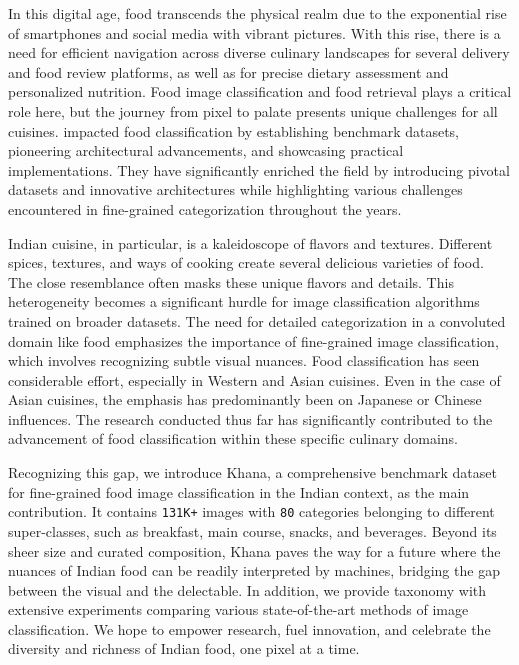 \documentclass{article}
\begin{document}
In this digital age, food transcends the physical realm due to the exponential rise of smartphones and social media with vibrant pictures. With this rise, there is a need for efficient navigation across diverse culinary landscapes for several delivery and food review platforms, as well as for precise dietary assessment and personalized nutrition. Food image classification and food retrieval plays a critical role here, but the journey from pixel to palate presents unique challenges for all cuisines. \cite{arxiv.1907.06167, Min2020, Min2023} impacted food classification by establishing benchmark datasets, pioneering architectural advancements, and showcasing practical implementations. They have significantly enriched the field by introducing pivotal datasets and innovative architectures while highlighting various challenges encountered in fine-grained categorization throughout the years.

Indian cuisine, in particular, is a kaleidoscope of flavors and textures. Different spices, textures, and ways of cooking create several delicious varieties of food. The close resemblance often masks these unique flavors and details. This heterogeneity becomes a significant hurdle for image classification algorithms trained on broader datasets. The need for detailed categorization in a convoluted domain like food emphasizes the importance of fine-grained image classification, which involves recognizing subtle visual nuances. Food classification has seen considerable effort, especially in Western and Asian cuisines. Even in the case of Asian cuisines, the emphasis has predominantly been on Japanese or Chinese influences. The research conducted thus far has significantly contributed to the advancement of food classification within these specific culinary domains.

Recognizing this gap, we introduce Khana, a comprehensive benchmark dataset for fine-grained food image classification in the Indian context, as the main contribution. It contains \texttt{131K+} images with \texttt{80} categories belonging to different super-classes, such as breakfast, main course, snacks, and beverages. Beyond its sheer size and curated composition, Khana paves the way for a future where the nuances of Indian food can be readily interpreted by machines, bridging the gap between the visual and the delectable. In addition, we provide taxonomy with extensive experiments comparing various state-of-the-art methods of image classification. We hope to empower research, fuel innovation, and celebrate the diversity and richness of Indian food, one pixel at a time.
\end{document}
